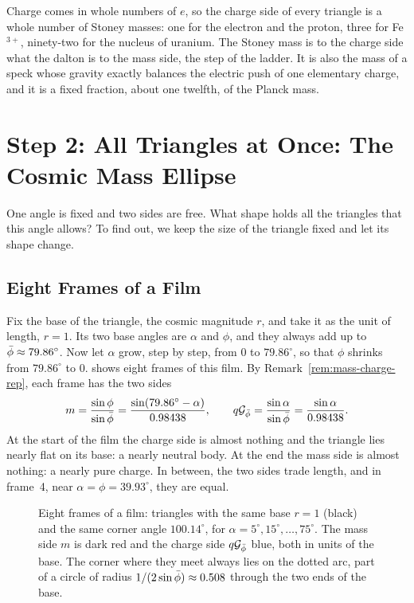 \begin{plainwords}
Charge comes in whole numbers of $e$, so the charge side of every triangle is a whole number of Stoney masses: one for the electron and the proton, three for Fe$^{3+}$, ninety-two for the nucleus of uranium. The Stoney mass is to the charge side what the dalton is to the mass side, the step of the ladder. It is also the mass of a speck whose gravity exactly balances the electric push of one elementary charge, and it is a fixed fraction, about one twelfth, of the Planck mass.
\end{plainwords}

\section{Step 2: All Triangles at Once: The Cosmic Mass Ellipse}\label{sec:sm-ellipse}

One angle is fixed and two sides are free. What shape holds all the triangles that this angle allows? To find out, we keep the size of the triangle fixed and let its shape change.

\subsection{Eight Frames of a Film}\label{subsec:sm-film}

Fix the base of the triangle, the cosmic magnitude $r$, and take it as the unit of length, $r = 1$. Its two base angles are $\alpha$ and $\phi$, and they always add up to $\bar{\phi} \approx 79.86^\circ$. Now let $\alpha$ grow, step by step, from $0$ to $79.86^\circ$, so that $\phi$ shrinks from $79.86^\circ$ to $0$.  shows eight frames of this film. By Remark~\ref{rem:mass-charge-rep}, each frame has the two sides
\[
m = \frac{\sin\phi}{\sin\bar{\phi}} = \frac{\sin(79.86^\circ - \alpha)}{0.98438}, \qquad q\mathcal{G}_{\bar{\phi}} = \frac{\sin\alpha}{\sin\bar{\phi}} = \frac{\sin\alpha}{0.98438}.
\]
At the start of the film the charge side is almost nothing and the triangle lies nearly flat on its base: a nearly neutral body. At the end the mass side is almost nothing: a nearly pure charge. In between, the two sides trade length, and in frame~4, near $\alpha = \phi = 39.93^\circ$, they are equal.

\begin{figure}[tb]
\myfloatalign

\caption[Eight frames of a film]{Eight frames of a film: triangles with the same base $r = 1$ (black) and the same corner angle $100.14^\circ$, for $\alpha = 5^\circ, 15^\circ, \ldots, 75^\circ$. The mass side $m$ is dark red and the charge side $q\mathcal{G}_{\bar{\phi}}$ blue, both in units of the base. The corner where they meet always lies on the dotted arc, part of a circle of radius $1/(2\sin\bar{\phi}) \approx 0.508$ through the two ends of the base.}
\label{fig:sm-film}
\end{figure}

